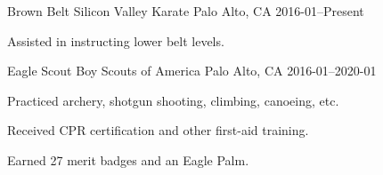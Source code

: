 

\begin{cventries}

  \cventry
    {Brown Belt} %
    {Silicon Valley Karate} %
    {Palo Alto, CA} %
    {2016-01–Present} %
    {
      \begin{cvitems} %
        \item {Assisted in instructing lower belt levels.}
      \end{cvitems}
    }

  \cventry
    {Eagle Scout} %
    {Boy Scouts of America} %
    {Palo Alto, CA} %
    {2016-01–2020-01} %
    {
      \begin{cvitems} %
        \item {Practiced archery, shotgun shooting, climbing, canoeing, etc.}
        \item {Received CPR certification and other first-aid training.}
        \item {Earned 27 merit badges and an Eagle Palm.}
      \end{cvitems}
    }

\end{cventries}
